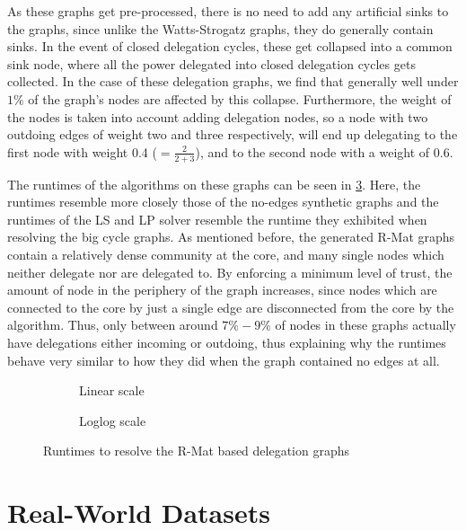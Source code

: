 As these graphs get pre-processed, there is no need to add any artificial sinks to the graphs, since unlike the Watts-Strogatz graphs, they do generally contain sinks. In the event of closed delegation cycles, these get collapsed into a common sink node, where all the power delegated into closed delegation cycles gets collected. In the case of these delegation graphs, we find that generally well under $1\%$ of the graph's nodes are affected by this collapse. Furthermore, the weight of the nodes is taken into account adding delegation nodes, so a node with two outdoing edges of weight two and three respectively, will end up delegating to the first node with weight 0.4 ($= \frac{2}{2+3}$), and to the second node with a weight of 0.6.

The runtimes of the algorithms on these graphs can be seen in \cref{fig:rmat}. Here, the runtimes resemble more closely those of the no-edges synthetic graphs and the runtimes of the LS and LP solver resemble the runtime they exhibited when resolving the big cycle graphs. As mentioned before, the generated R-Mat graphs contain a relatively dense community at the core, and many single nodes which neither delegate nor are delegated to. By enforcing a minimum level of trust, the amount of node in the periphery of the graph increases, since nodes which are connected to the core by just a single edge are disconnected from the core by the algorithm. Thus, only between around $7\% - 9\%$ of nodes in these graphs actually have delegations either incoming or outdoing, thus explaining why the runtimes behave very similar to how they did when the graph contained no edges at all.

\begin{figure}[t]
    \centering
    \begin{subfigure}[t]{0.45\textwidth}
        \centering
        \caption{Linear scale}
        \label{subfig:rmat_linear}
    \end{subfigure}
    \hfill
    \begin{subfigure}[t]{0.45\textwidth}
        \centering
        \caption{Loglog scale}
        \label{subfig:rmat_loglog}
    \end{subfigure}
    \caption{Runtimes to resolve the R-Mat based delegation graphs}
    \label{fig:rmat}
\end{figure}


\section{Real-World Datasets}

